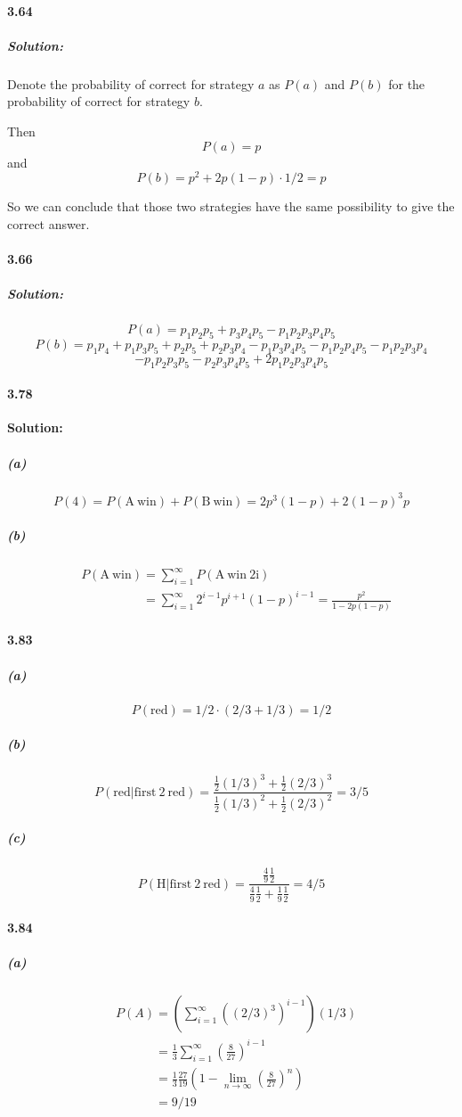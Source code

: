 \documentclass[11pt]{article}
\begin{document}
	\paragraph{3.64}
		\subparagraph{Solution:} Denote the probability of correct for strategy $a$ as $P(a)$ and $P(b)$ for the probability of correct for strategy $b$.
		
			Then \[P(a) = p\] and \[P(b) = p^2 + 2p(1 - p) \cdot 1/2 = p\]
			
						
			So we can conclude that those two strategies have the same possibility to give the correct answer.
	\paragraph{3.66} 
		\subparagraph{Solution:} 
		\[P(a) = p_1 p_2 p_5 + p_3 p_4 p_5 - p_1 p_2 p_3 p_4 p_5\]
		\[P(b) = p_1p_4 + p_1 p_3 p_5 + p_2p_5 + p_2p_3p_4 - p_1p_3p_4p_5 - p_1p_2p_4p_5 - p_1p_2p_3p_4\]
		\[ - p_1 p_2 p_3 p_5 - p_2 p_3 p_4 p_5 + 2p_1 p_2 p_3 p_4 p_5\]
	\paragraph{3.78}\textbf{Solution:}
		\subparagraph{(a)}\[P(4) = P(\mathrm{A\ win}) + P(\mathrm{B\ win}) = 2p^3(1 - p) + 2(1 - p)^3p\]
		\subparagraph{(b)}
		\begin{align}
			&P(\mathrm{A\ win}) = \sum_{i = 1}^{\infty} P(\mathrm{A\ win\ 2i})\nonumber\\
			&\phantom{P(\mathrm{A\ win})} = \sum_{i = 1}^{\infty} 2^{i - 1}p^{i + 1}(1 - p)^{i - 1} = \frac{p^2}{1 - 2p(1 - p)}
		\end{align}
		
	\paragraph{3.83}
		\subparagraph{(a)}
			\[P(\mathrm{red}) = 1/2 \cdot (2/3 + 1/3) = 1/2\]
		\subparagraph{(b)}
			\[P(\mathrm{red} | \mathrm{first\ 2\ red}) = \frac{\frac{1}{2}(1/3)^3 + \frac{1}{2}(2/3)^3}{\frac{1}{2}(1/3)^2 + \frac{1}{2}(2/3)^2} = 3/5\]
		\subparagraph{(c)}
			\[P(\mathrm{H} | \mathrm{first\ 2\ red}) = \frac{\frac{4}{9}\frac{1}{2}}{\frac{4}{9}\frac{1}{2} + \frac{1}{9}\frac{1}{2}} = 4/5\]
	\paragraph{3.84}
		\subparagraph{(a)}
			\begin{align}
			&P(A) = (\sum_{i = 1}^\infty ((2/3)^3)^{i - 1})(1/3)\nonumber\\ 
			&\phantom{P(A)} = \frac{1}{3} \sum_{i = 1}^\infty (\frac{8}{27})^{i - 1}\nonumber\\
			&\phantom{P(A)} = \frac{1}{3} \frac{27}{19} (1 - \lim_{n \rightarrow \infty} (\frac{8}{27})^n)\nonumber\\ 
			&\phantom{P(A)} = 9/19\nonumber
			\end{align}
			
\end{document}
